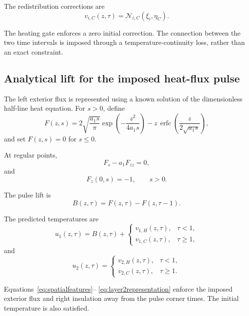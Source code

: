\documentclass[11pt,a4paper]{article}
\newcommand{\erfc}{\operatorname{erfc}}
\begin{document}
The redistribution corrections are
\begin{equation}
v_{i,C}(z,\tau)
=
\mathcal{N}_{i,C}(\xi_i,\eta_C).
\end{equation}

The heating gate enforces a zero initial correction.
The connection between the two time intervals is imposed
through a temperature-continuity loss, rather than an exact
constraint.

\subsection{Analytical lift for the imposed heat-flux pulse}

The left exterior flux is represented using a known solution
of the dimensionless half-line heat equation.
For $s>0$, define
\begin{equation}
F(z,s)
=
2\sqrt{\frac{a_1s}{\pi}}
\exp\left(-\frac{z^2}{4a_1s}\right)
-
z\,\erfc\left(\frac{z}{2\sqrt{a_1s}}\right),
\label{eq:stepresponse}
\end{equation}
and set $F(z,s)=0$ for $s\leq0$.

At regular points,
\begin{equation}
F_s-a_1F_{zz}=0,
\end{equation}
and
\begin{equation}
F_z(0,s)=-1,
\qquad s>0.
\end{equation}

The pulse lift is
\begin{equation}
B(z,\tau)=F(z,\tau)-F(z,\tau-1).
\label{eq:pulselift}
\end{equation}

The predicted temperatures are
\begin{equation}
u_1(z,\tau)
=
B(z,\tau)+
\begin{cases}
v_{1,H}(z,\tau), & \tau<1,\\
v_{1,C}(z,\tau), & \tau\geq1,
\end{cases}
\label{eq:layer1representation}
\end{equation}
and
\begin{equation}
u_2(z,\tau)
=
\begin{cases}
v_{2,H}(z,\tau), & \tau<1,\\
v_{2,C}(z,\tau), & \tau\geq1.
\end{cases}
\label{eq:layer2representation}
\end{equation}

Equations~\eqref{eq:spatialfeatures}--%
\eqref{eq:layer2representation} enforce the imposed exterior
flux and right insulation away from the pulse corner times.
The initial temperature is also satisfied.
\end{document}
